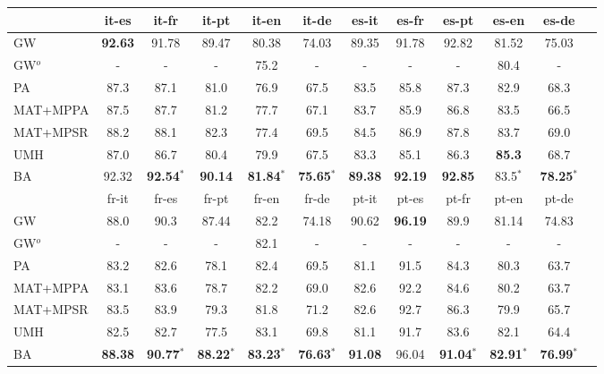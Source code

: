 \documentclass{article}
\begin{document}
\begin{table*}[ht]
\centering

\begin{tabular}{@{}l@{}*{11}{c}@{}}
    \hline
      & it-es & it-fr & it-pt & it-en & it-de & es-it & es-fr & es-pt & es-en & es-de \\
      \hline
GW & \textbf{92.63} & {91.78} & {89.47} & {80.38} & {74.03} & {89.35} & {91.78} & {92.82} & {81.52} & {75.03} \\
{GW}$^o$ & - & - & - & {75.2} & {-} & - & - & - & {80.4} & - \\
PA & {87.3} & {87.1} & {81.0} & {76.9} & {67.5} & {83.5} & {85.8} & {87.3} & {82.9} & {68.3} \\
MAT+MPPA & {87.5} & {87.7} & {81.2} & {77.7} & {67.1} & {83.7} & {85.9} & {86.8} & {83.5} & {66.5} \\
MAT+MPSR & {88.2} & {88.1} & {82.3} & {77.4} & {69.5} & {84.5} & {86.9} & {87.8} & {83.7} & {69.0} \\
UMH & {87.0} & {86.7} & {80.4} & {79.9} & {67.5} & {83.3} & {85.1} & {86.3} & \textbf{85.3} & {68.7} \\
BA & 92.32 & \textbf{92.54}$^{*}$ & \textbf{90.14} & \textbf{81.84}$^{*}$ & \textbf{75.65}$^{*}$ & \textbf{89.38} & \textbf{92.19} & \textbf{92.85} & {83.5}$^{*}$ & \textbf{78.25}$^{*}$ \\
    \hline
 & fr-it & fr-es & fr-pt & fr-en & fr-de & pt-it & pt-es & pt-fr & pt-en & pt-de \\
 \hline
GW & {88.0} & {90.3} & {87.44} & {82.2} & {74.18} & {90.62} & \textbf{96.19} & {89.9} & {81.14} & {74.83} \\
{GW}$^o$ & - & - & - & {82.1} & {-} & - & - & - & {-} & - \\
PA & {83.2} & {82.6} & {78.1} & {82.4} & {69.5} & {81.1} & {91.5} & {84.3} & {80.3} & {63.7} \\
MAT+MPPA & {83.1} & {83.6} & {78.7} & {82.2} & {69.0} & {82.6} & {92.2} & {84.6} & {80.2} & {63.7} \\
MAT+MPSR & {83.5} & {83.9} & {79.3} & {81.8} & {71.2} & {82.6} & {92.7} & {86.3} & {79.9} & {65.7} \\
UMH & {82.5} & {82.7} & {77.5} & {83.1} & {69.8} & {81.1} & {91.7} & {83.6} & {82.1} & {64.4} \\
BA  & \textbf{88.38} & \textbf{90.77}$^{*}$ & \textbf{88.22}$^{*}$ & \textbf{83.23}$^{*}$ & \textbf{76.63}$^{*}$ & \textbf{91.08} & {96.04} & \textbf{91.04}$^{*}$ & \textbf{82.91}$^{*}$ & \textbf{76.99}$^{*}$ \\


\end{tabular}
\end{table*}
\end{document}
